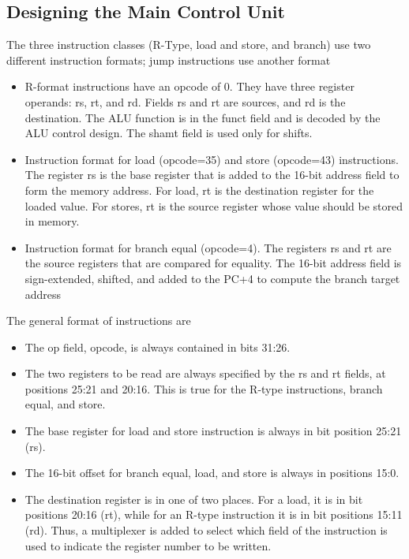 \documentclass[12pt]{article}
\theoremstyle{definition}
\begin{document}
  \subsection{Designing the Main Control Unit}
  The three instruction classes (R-Type, load and store, and branch) use two different instruction formats; jump instructions use another format
  \begin{itemize}
    \item R-format instructions have an opcode of 0.
    They have three register operands: rs, rt, and rd.
    Fields rs and rt are sources, and rd is the destination.
    The ALU function is in the funct field and is decoded by the ALU control design.
    The shamt field is used only for shifts.
    \item Instruction format for load (opcode=35) and store (opcode=43) instructions.
    The register rs is the base register that is added to the 16-bit address field to form the memory address.
    For load, rt is the destination register for the loaded value.
    For stores, rt is the source register whose value should be stored in memory.
    \item Instruction format for branch equal (opcode=4).
    The registers rs and rt are the source registers that are compared for equality.
    The 16-bit address field is sign-extended, shifted, and added to the PC+4 to compute the branch target address
  \end{itemize}

  The general format of instructions are
  \begin{itemize}
    \item The op field, opcode, is always contained in bits 31:26.
    \item The two registers to be read are always specified by the rs and rt fields, at positions 25:21 and 20:16.
    This is true for the R-type instructions, branch equal, and store.
    \item The base register for load and store instruction is always in bit position 25:21 (rs).
    \item The 16-bit offset for branch equal, load, and store is always in positions 15:0.
    \item The destination register is in one of two places.
    For a load, it is in bit positions 20:16 (rt), while for an R-type instruction it is in bit positions 15:11 (rd).
    Thus, a multiplexer is added to select which field of the instruction is used to indicate the register number to be written.
  \end{itemize}
\end{document}
